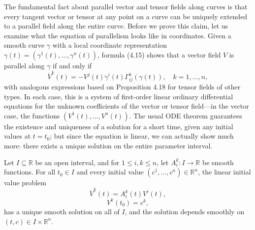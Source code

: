 The fundamental fact about parallel vector and tensor fields along curves is that every tangent vector or tensor at any point on a curve can be uniquely extended to a parallel field along the entire curve. Before we prove this claim, let us examine what the equation of parallelism looks like in coordinates. Given a smooth curve $\gamma$ with a local coordinate representation $\gamma(t) = (\gamma^1(t), \ldots, \gamma^n(t))$, formula (4.15) shows that a vector field $V$ is parallel along $\gamma$ if and only if
\begin{equation}
\dot{V}^k(t) = -V^j(t) \dot{\gamma}^i(t) \Gamma^k_{ij}(\gamma(t)), \quad k = 1, \ldots, n,
\tag{4.19}
\end{equation}
with analogous expressions based on Proposition 4.18 for tensor fields of other types. In each case, this is a system of first-order linear ordinary differential equations for the unknown coefficients of the vector or tensor field---in the vector case, the functions $(V^1(t), \ldots, V^n(t))$. The usual ODE theorem guarantees the existence and uniqueness of a solution for a short time, given any initial values at $t = t_0$; but since the equation is linear, we can actually show much more: there exists a unique solution on the entire parameter interval.

\begin{theorem}\label{thm:linear-ode-existence-uniqueness}
Let $I \subseteq \mathbb{R}$ be an open interval, and for $1 \le i,k \le n$, let $A^k_i : I \to \mathbb{R}$ be smooth functions. For all $t_0 \in I$ and every initial value $(c^1, \ldots, c^n) \in \mathbb{R}^n$, the linear initial value problem
\begin{equation}
\dot{V}^k(t) = A^k_i(t) V^i(t),
\tag{4.20}
\end{equation}
\[
V^k(t_0) = c^k,
\]
has a unique smooth solution on all of $I$, and the solution depends smoothly on $(t, c) \in I \times \mathbb{R}^n$.
\end{theorem}

